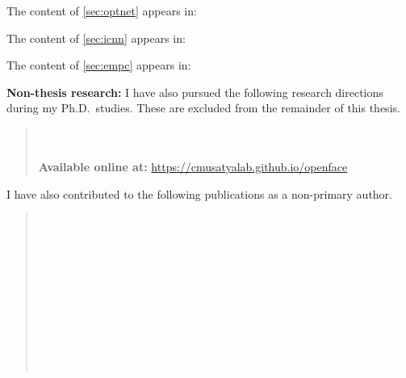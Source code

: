 \noindent The content of \cref{sec:optnet} appears in:
\vspace{5mm}

\noindent The content of \cref{sec:icnn} appears in:
\vspace{5mm}

\noindent The content of \cref{sec:empc} appears in:
\vspace{5mm}

\noindent
\textbf{Non-thesis research:}
I have also pursued the following research
directions during my Ph.D.~studies.
These are excluded from the remainder of this thesis.

\begin{leftbar}
\begin{quote}%
   \\[5mm]
   \\
  \textbf{Available online at:}
  \url{https://cmusatyalab.github.io/openface} \\
\end{quote}
\end{leftbar}

\vspace{7mm}
\noindent
I have also contributed to the following
publications as a non-primary author.

\begin{leftbar}
\begin{quote}%
   \\[5mm]
   \\[5mm]
   \\[5mm]
   \\[5mm]
   \\[5mm]
   \\[5mm]
   \\[5mm]
   \\[5mm]
   \\[5mm]
   \\[5mm]
\end{quote}
\end{leftbar}

